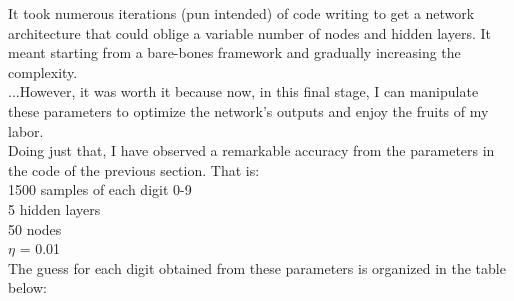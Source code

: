 \documentclass[letterpaper,11pt]{article}
\begin{document}
It took numerous iterations (pun intended) of code writing to get a network architecture that could oblige a variable number of nodes and hidden layers. It meant starting from a bare-bones framework and gradually increasing the complexity.\\

...However, it was worth it because now, in this final stage, I can manipulate these parameters to optimize the network's outputs and enjoy the fruits of my labor.\\

Doing just that, I have observed a remarkable accuracy from the parameters in the code of the previous section. That is:\\

1500 samples of each digit 0-9\\
5 hidden layers\\
50 nodes\\
$\eta$ = 0.01\\

The guess for each digit obtained from these parameters is organized in the table below:
\end{document}
